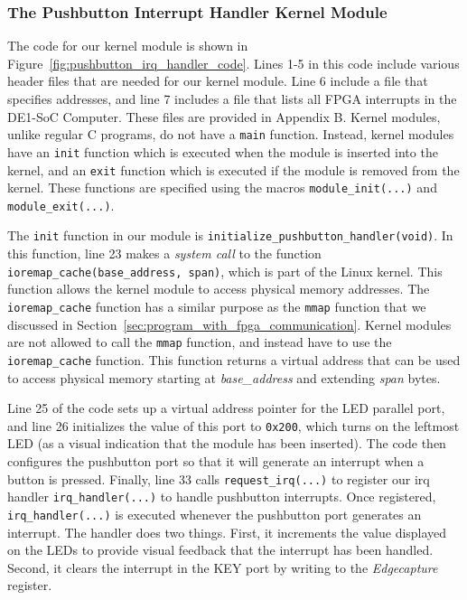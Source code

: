 \documentclass[11pt, twoside, pdftex]{article}
\begin{document}
\subsubsection{The Pushbutton Interrupt Handler Kernel Module}

The code for our kernel module is shown in Figure~\ref{fig:pushbutton_irq_handler_code}.
Lines 1-5 in this code include various header files that are needed for our kernel module. 
Line 6 include a file that specifies addresses, and line 7 includes a file that lists all
FPGA interrupts in the DE1-SoC Computer. These files are provided in Appendix B.
Kernel modules, unlike regular C programs, do not have a \texttt{main} function. Instead, 
kernel modules have an \texttt{init} function which is executed when 
the module is inserted into the kernel, and an \texttt{exit} function which is executed if 
the module is removed from the kernel. These functions are specified using the macros 
\texttt{module\_init(...)} and \texttt{module\_exit(...)}. 

The \texttt{init} function in our module is
\texttt{initialize\_pushbutton\_handler(void)}. In this function, line 23 makes a 
{\it system call} to the function \texttt{ioremap\_cache(base\_address, span)}, which is part
of the Linux kernel. This function allows the kernel module to access physical memory
addresses. The \texttt{ioremap\_cache} function has a similar purpose as the 
\texttt{mmap} function that we discussed in Section~\ref{sec:program_with_fpga_communication}.
Kernel modules are not allowed to call the \texttt{mmap} function, and instead have to
use the \texttt{ioremap\_cache} function. This function returns a virtual address that can be 
used to access physical memory starting at {\it base\_address} and extending {\it span} bytes.

Line 25 of the code sets up a virtual address pointer for the LED parallel port, and line
26 initializes the value of this port to \texttt{0x200}, which turns on the leftmost 
LED (as a visual indication that the module has been inserted). The code then configures the 
pushbutton port so that it will generate an interrupt when a button is pressed. Finally, 
line 33 calls \texttt{request\_irq(...)} to register our irq handler \texttt{irq\_handler(...)}
to handle pushbutton interrupts. 
Once registered, \texttt{irq\_handler(...)} is executed whenever the pushbutton port generates 
an interrupt. The handler does two things. First, it increments the value displayed on the 
LEDs to provide visual feedback that the interrupt has been handled. Second, it clears the 
interrupt in the KEY port by writing to the {\it Edgecapture} register.
\end{document}
